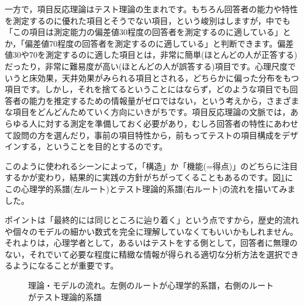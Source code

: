 \documentclass{ltjsbook}
\begin{document}
一方で，項目反応理論はテスト理論の生まれです。もちろん回答者の能力や特性を測定するのに優れた項目とそうでない項目，という峻別はしますが，中でも「この項目は測定能力の偏差値30程度の回答者を測定するのに適している」とか，「偏差値70程度の回答者を測定するのに適している」と判断できます。偏差値30や70を測定するのに適した項目とは，非常に簡単(ほとんどの人が正答する)だったり，非常に難易度が高い(ほとんどの人が誤答する)項目です。心理尺度でいうと床効果，天井効果がみられる項目とされる，どちらかに偏った分布をもつ項目です。しかし，それを捨てるということにはならず，どのような項目でも回答者の能力を推定するための情報量がゼロではない，という考えから，さまざまな項目をどんどんためていく方向にいきがちです。項目反応理論の文脈では，あらゆる人に対する測定を準備しておく必要があり，むしろ回答者の特性にあわせて設問の方を選んだり，事前の項目特性から，前もってテストの項目構成をデザインする，ということを目的とするのです。

このように使われるシーンによって，「構造」か「機能(=得点)」のどちらに注目するかが変わり，結果的に実践の方針がちがってくることもあるのです。図\ref{fig::05_06}にこの心理学的系譜(左ルート)とテスト理論的系譜(右ルート)の流れを描いてみました。

ポイントは「最終的には同じところに辿り着く」という点ですから，歴史的流れや個々のモデルの細かい数式を完全に理解していなくてもいいかもしれません。それよりは，心理学者として，あるいはテストをする側として，回答者に無理のない，それでいて必要な程度に精緻な情報が得られる適切な分析方法を選択できるようになることが重要です。
\begin{figure}[ht]
    \caption{理論・モデルの流れ。左側のルートが心理学的系譜，右側のルートがテスト理論的系譜}
    \label{fig::05_06}
\end{figure}
\end{document}
